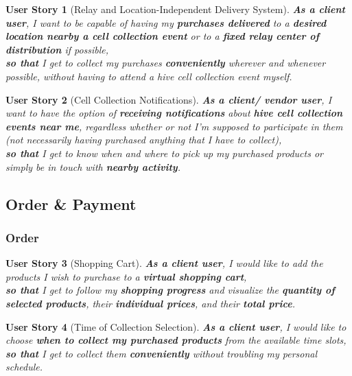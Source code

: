 \documentclass[a4paper,12pt]{book}
\theoremstyle{break}
\newtheorem{userStory}{User Story}
\theoremstyle{break}
\theoremstyle{break}
\theoremstyle{break}
\theoremstyle{definition}
\theoremstyle{remark}
\begin{document}
\begin{userStory}[Relay and Location-Independent Delivery System]
\textbf{As a {\color{green} client} user}, I want to be capable of having my \textbf{purchases delivered} to a \textbf{desired location nearby a cell collection event} or to a \textbf{fixed relay center of distribution} if possible,\\
\indent
\textbf{so that} I get to collect my purchases \textbf{conveniently} wherever and whenever possible, without having to attend a hive cell collection event myself.
\end{userStory}

\begin{userStory}[Cell Collection Notifications]
\textbf{As a {\color{green} client}/{\color{red} vendor} user}, I want to have the option of \textbf{receiving notifications} about \textbf{hive cell collection events near me}, regardless whether or not I'm supposed to participate in them (not necessarily having purchased anything that I have to collect),\\
\indent
\textbf{so that} I get to know when and where to pick up my purchased products or simply be in touch with \textbf{nearby activity}.
\end{userStory}

\subsection{Order \& Payment}
\subsubsection{Order}
\begin{userStory}[Shopping Cart]
\textbf{As a {\color{green} client} user}, I would like to add the products I wish to purchase to a \textbf{virtual shopping cart},\\
\indent
\textbf{so that} I get to follow my \textbf{shopping progress} and visualize the \textbf{quantity of selected products}, their \textbf{individual prices}, and their \textbf{total price}.
\end{userStory}

\begin{userStory}[Time of Collection Selection]
\textbf{As a {\color{green} client} user}, I would like to choose \textbf{when to collect my purchased products} from the available time slots,\\
\indent
\textbf{so that} I get to collect them \textbf{conveniently} without troubling my personal schedule.
\end{userStory}
\end{document}
